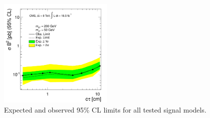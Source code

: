 \begin{figure}[htbp]
\includegraphics[width=0.49\textwidth]{plots/limits/200_50e.pdf}

\caption{Expected and observed 95\% CL limits for all tested signal models.\label{fig:limits}}
\end{figure}

